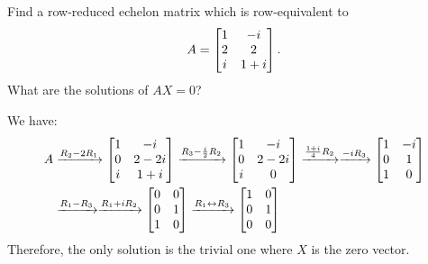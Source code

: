 \begin{xca}
  Find a row-reduced echelon matrix which is row-equivalent to \[ A = \begin{bmatrix}1&-i \\ 2&2 \\ i&1+i\end{bmatrix}. \]
  What are the solutions of $AX = 0$?
\end{xca}
\begin{sol}
  We have:
  \begin{equation*}
    \begin{split}
      A & \xrightarrow{R_2 - 2R_1} \begin{bmatrix}1&-i \\ 0&2-2i \\ i&1+i\end{bmatrix}
      \xrightarrow{R_3 - \frac{i}{2}R_2} \begin{bmatrix}1&-i \\ 0&2-2i \\ i&0\end{bmatrix}
      \xrightarrow{\frac{1+i}{4}R_2}
      \xrightarrow{-iR_3} \begin{bmatrix}1&-i \\ 0&1 \\ 1&0\end{bmatrix} \\
      & \xrightarrow{R_1 - R_3}
      \xrightarrow{R_1 + iR_2} \begin{bmatrix}0&0 \\ 0&1 \\ 1&0\end{bmatrix}
      \xrightarrow{R_1 \leftrightarrow R_3} \begin{bmatrix}1&0 \\ 0&1 \\ 0&0\end{bmatrix}
    \end{split}
  \end{equation*}
  Therefore, the only solution is the trivial one where $X$ is the zero vector.
\end{sol}

